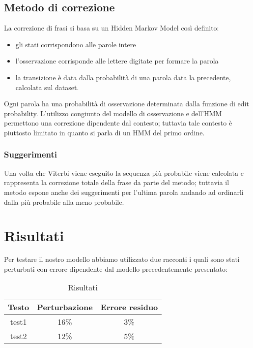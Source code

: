 \documentclass[a4paper,11pt]{article}
\begin{document}
	\subsection{Metodo di correzione}
    	La correzione di frasi si basa su un Hidden Markov Model così definito:
         \begin{itemize}
  			\item gli stati corrispondono alle parole intere
  			\item l'osservazione corrisponde alle lettere digitate per formare la parola
  			\item la transizione è data dalla probabilità di una parola data la precedente, calcolata sul dataset.
 		\end{itemize}
        Ogni parola ha una probabilità di osservazione determinata dalla funzione di edit probability. L'utilizzo congiunto del modello di osservazione
        e dell'HMM permettono una correzione dipendente dal contesto; tuttavia tale contesto è piuttosto limitato in quanto si parla di un HMM del primo ordine.
        \subsubsection{Suggerimenti}
          Una volta che Viterbi viene eseguito la sequenza più probabile viene calcolata e rappresenta la correzione totale della frase da parte del metodo; 
          tuttavia il metodo espone anche dei suggerimenti per l'ultima parola andando ad ordinarli dalla più probabile alla meno probabile.
 	\newpage
\section{Risultati}
	Per testare il nostro modello abbiamo utilizzato due racconti i quali sono stati perturbati con errore dipendente dal modello precedentemente presentato:\\
     \begin{table}[h]
     \centering
     \begin{tabular}{|c|c|c|}
     \hline
      \textbf{Testo} & \textbf{Perturbazione} & \textbf{Errore residuo}\\
     \hline
        test1 & 16\% &  3\% \\
     \hline 
        test2 & 12\% & 5\%\\
     \hline
     \end{tabular}
     	\caption{Risultati}
     \end{table}
\end{document}

